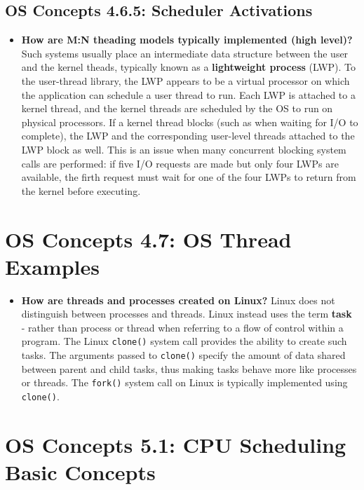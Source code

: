 \documentclass[12pt]{article}
\begin{document}
\subsection*{OS Concepts 4.6.5: Scheduler Activations}

\begin{itemize}
    \item \textbf{How are M:N theading models typically implemented (high level)?} Such systems usually place an intermediate data structure between the user and the kernel theads, typically known as a \textbf{lightweight process} (LWP). To the user-thread library, the LWP appears to be a virtual processor on which the application can schedule a user thread to run. Each LWP is attached to a kernel thread, and the kernel threads are scheduled by the OS to run on physical processors. If a kernel thread blocks (such as when waiting for I/O to complete), the LWP and the corresponding user-level threads attached to the LWP block as well. This is an issue when many concurrent blocking system calls are performed: if five I/O requests are made but only four LWPs are available, the firth request must wait for one of the four LWPs to return from the kernel before executing.
\end{itemize}

\section*{OS Concepts 4.7: OS Thread Examples}

\begin{itemize}
    \item \textbf{How are threads and processes created on Linux?} Linux does not distinguish between processes and threads. Linux instead uses the term \textbf{task} - rather than process or thread when referring to a flow of control within a program. The Linux \texttt{clone()} system call provides the ability to create such tasks. The arguments passed to \texttt{clone()} specify the amount of data shared between parent and child tasks, thus making tasks behave more like processes or threads. The \texttt{fork()} system call on Linux is typically implemented using \texttt{clone()}.
\end{itemize}

\section*{OS Concepts 5.1: CPU Scheduling Basic Concepts}
\end{document}
